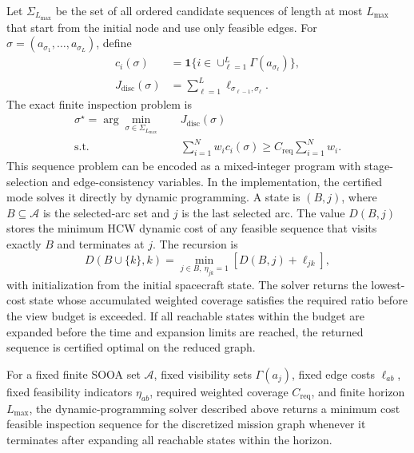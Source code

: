 Let $\Sigma_{L_{\max}}$ be the set of all ordered candidate sequences of
length at most $L_{\max}$ that start from the initial node and use only
feasible edges. For
$\sigma=(a_{\sigma_1},\ldots,a_{\sigma_L})$, define
\begin{align}
  c_i(\sigma) &=
  \mathbf{1}\{i\in\cup_{\ell=1}^{L}\Gamma(a_{\sigma_\ell})\},\\
  J_{\mathrm{disc}}(\sigma) &=
  \sum_{\ell=1}^{L}\ell_{\sigma_{\ell-1},\sigma_\ell}.
  \label{eq:finite-mip-objective}
\end{align}
The exact finite inspection problem is
\begin{equation}
  \begin{aligned}
  \sigma^\star=\arg\min_{\sigma\in\Sigma_{L_{\max}}}\quad
  & J_{\mathrm{disc}}(\sigma)\\
  \mathrm{s.t.}\quad
  & \sum_{i=1}^{N}w_i c_i(\sigma)
  \ge C_{\mathrm{req}}\sum_{i=1}^{N}w_i .
  \end{aligned}
\end{equation}
This sequence problem can be encoded as a mixed-integer program with
stage-selection and edge-consistency variables. In the implementation, the
certified mode solves it directly by dynamic programming. A state is
$(B,j)$, where $B\subseteq\mathcal A$ is the selected-arc set and $j$ is the
last selected arc. The value $D(B,j)$ stores the minimum HCW dynamic cost of
any feasible sequence that visits exactly $B$ and terminates at $j$. The
recursion is
\begin{equation}
  D(B\cup\{k\},k)=
  \min_{j\in B,\ \eta_{jk}=1}
  \left[D(B,j)+\ell_{jk}\right],
\end{equation}
with initialization from the initial spacecraft state. The solver returns the
lowest-cost state whose accumulated weighted coverage satisfies the required
ratio before the view budget is exceeded. If all reachable states within the
budget are expanded before the time and expansion limits are reached, the
returned sequence is certified optimal on the reduced graph.

\begin{theorem}
For a fixed finite SOOA set $\mathcal A$, fixed visibility sets
$\Gamma(a_j)$, fixed edge costs $\ell_{ab}$, fixed feasibility indicators
$\eta_{ab}$, required weighted coverage $C_{\mathrm{req}}$, and finite horizon
$L_{\max}$, the dynamic-programming solver described above returns a minimum
cost feasible inspection sequence for the discretized mission graph whenever
it terminates after expanding all reachable states within the horizon.
\end{theorem}

